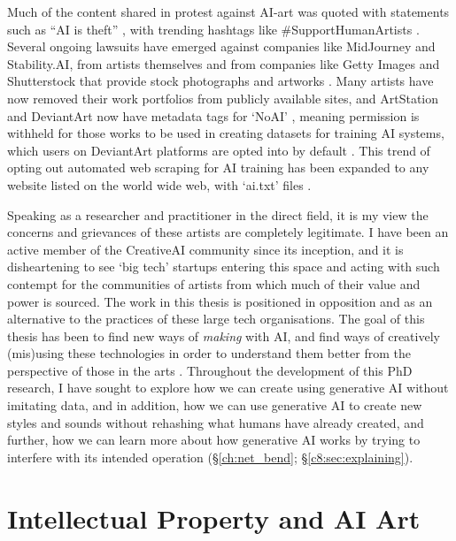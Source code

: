 Much of the content shared in protest against AI-art was quoted with statements such as “AI is theft” \citep{whiddington2022backlash}, with trending hashtags like \#SupportHumanArtists \citep{zakuga2022theft}. 
Several ongoing lawsuits have emerged against companies like MidJourney and Stability.AI, from artists themselves \citep{brittain2023artists} and from companies like Getty Images and Shutterstock that provide stock photographs and artworks \citep{vincent2023getty}. 
Many artists have now removed their work portfolios from publicly available sites, and ArtStation and DeviantArt now have metadata tags for ‘NoAI’ \citep{artstation2022noai}, meaning permission is withheld for those works to be used in creating datasets for training AI systems, which users on DeviantArt platforms are opted into by default \citep{deviantart2022optout}. 
This trend of opting out automated web scraping for AI training has been expanded to any website listed on the world wide web, with `ai.txt' files \citep{aitxt2024spawning}. 

Speaking as a researcher and practitioner in the direct field, it is my view the concerns and grievances of these artists are completely legitimate. 
I have been an active member of the CreativeAI community since its inception, and it is disheartening to see `big tech' startups entering this space and acting with such contempt for the communities of artists from which much of their value and power is sourced. 
The work in this thesis is positioned in opposition and as an alternative to the practices of these large tech organisations. 
The goal of this thesis has been to find new ways of \textit{making} with AI, and find ways of creatively (mis)using these technologies in order to understand them better from the perspective of those in the arts \citep{salvaggio2023aarg}.
Throughout the development of this PhD research, I have sought to explore how we can create using generative AI without imitating data, and in addition, how we can use generative AI to create new styles and sounds without rehashing what humans have already created, and further, how we can learn more about how generative AI works by trying to interfere with its intended operation (\S \ref{ch:net_bend}; \S \ref{c8:sec:explaining}).

\section{Intellectual Property and AI Art}

